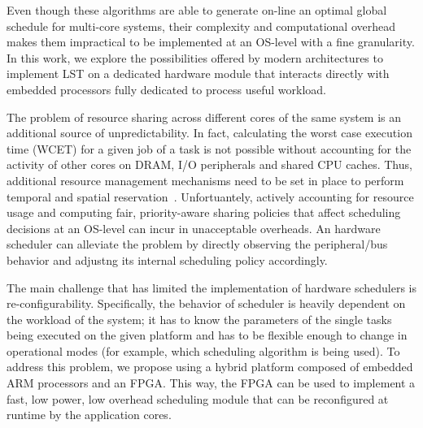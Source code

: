 Even though these algorithms are able to generate on-line an optimal
global schedule for multi-core systems, their complexity and
computational overhead makes them impractical to be implemented at an
OS-level with a fine granularity. In this work, we explore the
possibilities offered by modern architectures to implement LST on a
dedicated hardware module that interacts directly with embedded
processors fully dedicated to process useful workload. 

The problem of resource sharing across different cores of the same
system is an additional source of unpredictability. In fact,
calculating the worst case execution time (WCET) for a given job of a
task is not possible without accounting for the activity of other
cores on DRAM, I/O peripherals and shared CPU caches. Thus, additional
resource management mechanisms need to be set in place to perform
temporal and spatial reservation~\cite{memguard,
  cachecl}. Unfortuantely, actively accounting for resource usage and
computing fair, priority-aware sharing policies that affect scheduling
decisions at an OS-level can incur in unacceptable overheads. An
hardware scheduler can alleviate the problem by directly observing
the peripheral/bus behavior and adjustng its internal scheduling
policy accordingly.

The main challenge that has limited the implementation of hardware
schedulers is re-configurability. Specifically, the behavior of
scheduler is heavily dependent on the workload of the system; it has
to know the parameters of the single tasks being executed on the given
platform and has to be flexible enough to change in operational modes
(for example, which scheduling algorithm is being used). To address
this problem, we propose using a hybrid platform composed of embedded
ARM processors and an FPGA. This way, the FPGA can be used to
implement a fast, low power, low overhead scheduling module that can
be reconfigured at runtime by the application cores.
